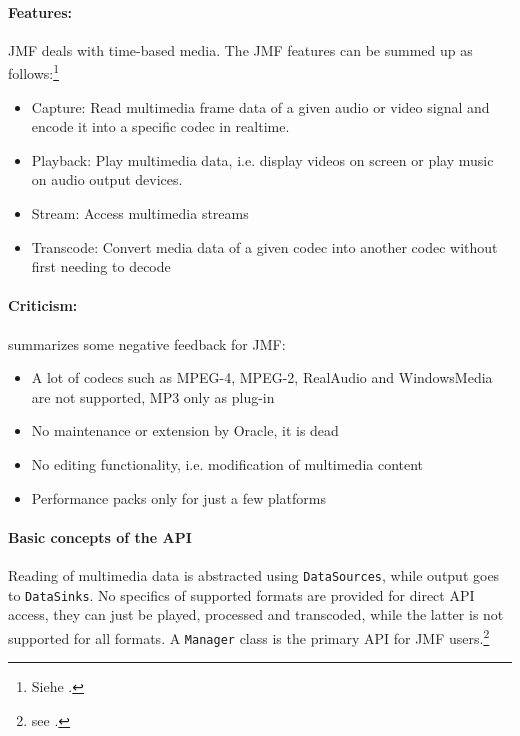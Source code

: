 \paragraph{Features:}
\label{sec:Features}

JMF deals with time-based media. The JMF features can be summed up as follows:\footnote{Siehe \cite{JMFWeb}.}
\begin{itemize}
\item Capture: Read multimedia frame data of a given audio or video signal and encode it into a specific codec in realtime.
\item Playback: Play multimedia data, i.e. display videos on screen or play music on audio output devices.
\item Stream: Access multimedia streams
\item Transcode: Convert media data of a given codec into another codec without first needing to decode
\end{itemize}


\paragraph{Criticism:}
\label{sec:Criticism}

\cite{WikJMF} summarizes some negative feedback for JMF:
\begin{itemize}
\item A lot of codecs such as MPEG-4, MPEG-2, RealAudio and WindowsMedia are not supported, MP3 only as plug-in
\item No maintenance or extension by Oracle, it is dead
\item No editing functionality, i.e. modification of multimedia content
\item Performance packs only for just a few platforms
\end{itemize}


\paragraph{Basic concepts of the API}
\label{sec:BasicAPIConcepts}

Reading of multimedia data is abstracted using \texttt{DataSources}, while output goes to \texttt{DataSinks}. No specifics of supported formats are provided for direct API access, they can just be played, processed and transcoded, while the latter is not supported for all formats. A \texttt{Manager} class is the primary API for JMF users.\footnote{see \cite{WikJMF}.}

